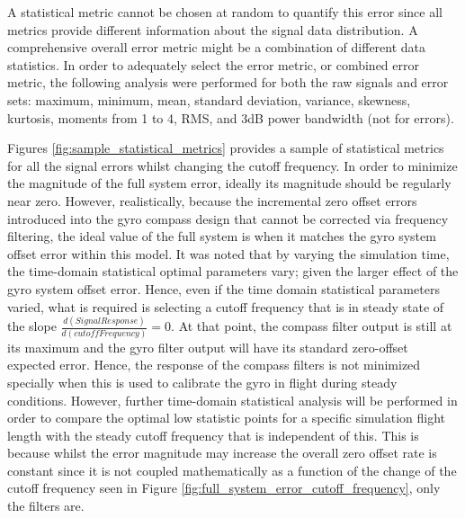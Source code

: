A statistical metric cannot be chosen at random to quantify this error since all metrics provide different information about the signal data distribution. A comprehensive overall error metric might be a combination of different data statistics. In order to adequately select the error metric, or combined error metric, the following analysis were performed for both the raw signals and error sets: maximum, minimum, mean, standard deviation, variance, skewness, kurtosis, moments from 1 to 4, RMS, and 3dB power bandwidth (not for errors).  

Figures \ref{fig:sample_statistical_metrics} provides a sample of statistical metrics for all the signal errors whilst changing the cutoff frequency. In order to minimize the magnitude of the full system error, ideally its magnitude should be regularly near zero. However, realistically, because the incremental zero offset errors introduced into the gyro compass design that cannot be corrected via frequency filtering, the ideal value of the full system is when it matches the gyro system offset error within this model. It was noted that by varying the simulation time, the time-domain statistical optimal parameters vary; given the larger effect of the gyro system offset error. Hence, even if the time domain statistical parameters varied, what is required is selecting a cutoff frequency that is in steady state of the slope $\frac{d(SignalResponse)}{d(cutoffFrequency)} = 0$. At that point, the compass filter output is still at its maximum and the gyro filter output will have its standard zero-offset expected error. Hence, the response of the compass filters is not minimized specially when this is used to calibrate the gyro in flight during steady conditions. However, further time-domain statistical analysis will be performed in order to compare the optimal low statistic points for a specific simulation flight length with the steady cutoff frequency that is independent of this. This is because whilst the error magnitude may increase the overall zero offset rate is constant since it is not coupled mathematically as a function of the change of the cutoff frequency seen in Figure \ref{fig:full_system_error_cutoff_frequency}, only the filters are. 

